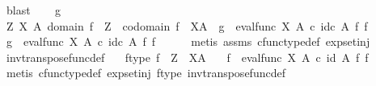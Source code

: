 \begin{isabellebody}
\ blast\isanewline
{}\isamarkupfalse%
\isanewline
\ \ \isamarkupfalse%
\ g\isanewline
\ \ \isamarkupfalse%
\ {\isachardoublequoteopen}{\isasymexists}Z\ X\ A{\isachardot}{\kern0pt}\ domain\ f\ {\isacharequal}{\kern0pt}\ Z\ {\isasymand}\ codomain\ f\ {\isacharequal}{\kern0pt}\ X\isactrlbsup A\isactrlesup \ {\isasymand}\ g\ {\isacharequal}{\kern0pt}\ eval{\isacharunderscore}{\kern0pt}func\ X\ A\ {\isasymcirc}\isactrlsub c\ id\isactrlsub c\ A\ {\isasymtimes}\isactrlsub f\ f{\isachardoublequoteclose}\isanewline
\ \ \isamarkupfalse%
\ \isamarkupfalse%
\ {\isachardoublequoteopen}g\ {\isacharequal}{\kern0pt}\ eval{\isacharunderscore}{\kern0pt}func\ X\ A\ {\isasymcirc}\isactrlsub c\ id\isactrlsub c\ A\ {\isasymtimes}\isactrlsub f\ f{\isachardoublequoteclose}\isanewline
\ \ \ \ \isamarkupfalse%
\ {\isacharparenleft}{\kern0pt}metis\ assms\ cfunc{\isacharunderscore}{\kern0pt}type{\isacharunderscore}{\kern0pt}def\ exp{\isacharunderscore}{\kern0pt}set{\isacharunderscore}{\kern0pt}inj{\isacharparenright}{\kern0pt}\isanewline
{}\isamarkupfalse%
%
\endisatagproof
{\isafoldproof}%
%
\isadelimproof
\isanewline
%
\endisadelimproof
\isanewline
{}\isamarkupfalse%
\ inv{\isacharunderscore}{\kern0pt}transpose{\isacharunderscore}{\kern0pt}func{\isacharunderscore}{\kern0pt}def{}{\isacharcolon}{\kern0pt}\isanewline
\ \ \ f{\isacharunderscore}{\kern0pt}type{\isacharcolon}{\kern0pt}\ {\isachardoublequoteopen}f\ {\isacharcolon}{\kern0pt}\ Z\ {\isasymrightarrow}\ X\isactrlbsup A\isactrlesup {\isachardoublequoteclose}\isanewline
\ \ \ {\isachardoublequoteopen}f\isactrlsup {\isasymflat}\ {\isacharequal}{\kern0pt}\ {\isacharparenleft}{\kern0pt}eval{\isacharunderscore}{\kern0pt}func\ X\ A{\isacharparenright}{\kern0pt}\ {\isasymcirc}\isactrlsub c\ {\isacharparenleft}{\kern0pt}id\ A\ {\isasymtimes}\isactrlsub f\ f{\isacharparenright}{\kern0pt}{\isachardoublequoteclose}\isanewline
%
\isadelimproof
\ \ %
\endisadelimproof
%
\isatagproof
{}\isamarkupfalse%
\ {\isacharparenleft}{\kern0pt}metis\ cfunc{\isacharunderscore}{\kern0pt}type{\isacharunderscore}{\kern0pt}def\ exp{\isacharunderscore}{\kern0pt}set{\isacharunderscore}{\kern0pt}inj\ f{\isacharunderscore}{\kern0pt}type\ inv{\isacharunderscore}{\kern0pt}transpose{\isacharunderscore}{\kern0pt}func{\isacharunderscore}{\kern0pt}def{}{\isacharparenright}{\kern0pt}%
\endisatagproof
{\isafoldproof}%
%
\isadelimproof
\isanewline
%
\endisadelimproof

\end{isabellebody}
